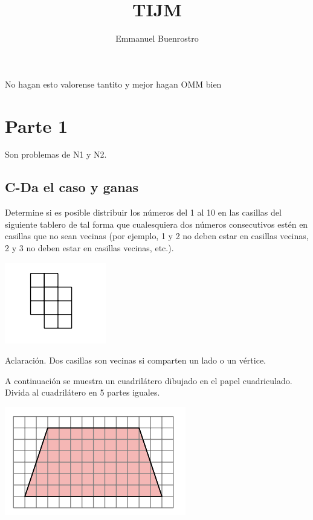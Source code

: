 \documentclass[11pt]{scrartcl}
\title {TIJM}
\author{Emmanuel Buenrostro}
\begin{document}
\maketitle


\textcolor{noseve}{No hagan esto  valorense tantito y mejor hagan OMM bien}

\section{Parte 1}
Son problemas de N1 y N2.



\subsection{C-Da el caso y ganas}
\begin{problem}[2024 N1/1]
Determine si es posible distribuir los n\'umeros del 1 al 10 en las casillas del siguiente tablero
de tal forma que cualesquiera dos n\'umeros consecutivos est\'en en casillas que no sean vecinas
(por ejemplo, 1 y 2 no deben estar en casillas vecinas, 2 y 3 no deben estar en casillas vecinas,
etc.).
\begin{center}
\includegraphics[scale=1]{24N11.png}
\end{center}
Aclaraci\'on. Dos casillas son vecinas si comparten un lado o un v\'ertice.
\end{problem}

\begin{problem} [2024 N1/2]
A continuaci\'on se muestra un cuadril\'atero dibujado en el papel cuadriculado. Divida al cuadril\'atero en 5 partes iguales.

\begin{center}
\includegraphics[scale=1]{24N12.png}
\end{center}
\end{problem}
\end{document}
